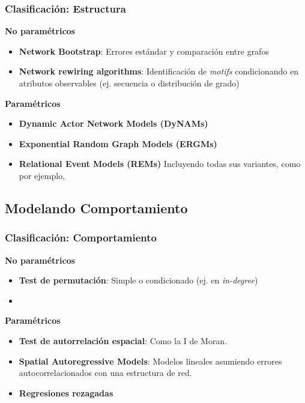 \documentclass[handout]{beamer}
\begin{document}
\begin{frame}
	\frametitle{Clasificación: Estructura}
	
	\textbf{No paramétricos}
	\begin{itemize}
		\item \textbf{Network Bootstrap}: Errores estándar y comparación entre grafos
		\item \textbf{Network rewiring algorithms}: Identificación de \textit{motifs} condicionando en atributos observables (ej. secuencia o distribución de grado)
	\end{itemize}
	
	\textbf{Paramétricos}
	
	\begin{itemize}
		\item \textbf{Dynamic Actor Network Models (DyNAMs)}
		\item \textbf{Exponential Random Graph Models (ERGMs)}
		\item \textbf{Relational Event Models (REMs)} Incluyendo todas sus variantes, como por ejemplo, 
	\end{itemize}
	
\end{frame}

\subsection{Modelando Comportamiento}

\begin{frame}
	\frametitle{Clasificación: Comportamiento}
	
	\textbf{No paramétricos}
	\begin{itemize}
		\item \textbf{Test de permutación}: Simple o condicionado (ej. en \textit{in-degree})
		\item 
	\end{itemize}

	\textbf{Paramétricos}
	\begin{itemize}
		\item \textbf{Test de autorrelación espacial}: Como la I de Moran.
		\item \textbf{Spatial Autoregressive Models}: Modelos lineales asumiendo errores autocorrelacionados con una estructura de red.
		\item \textbf{Regresiones rezagadas}
	\end{itemize}
	
\end{frame}
\end{document}
